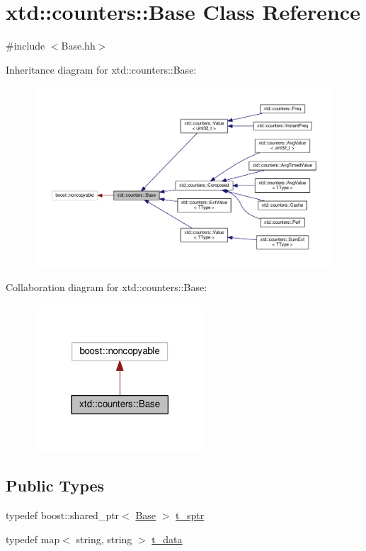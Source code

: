 \hypertarget{classxtd_1_1counters_1_1Base}{}\section{xtd\+:\+:counters\+:\+:Base Class Reference}
\label{classxtd_1_1counters_1_1Base}


{\ttfamily \#include $<$Base.\+hh$>$}



Inheritance diagram for xtd\+:\+:counters\+:\+:Base\+:
\nopagebreak
\begin{figure}[H]
\begin{center}
\leavevmode
\includegraphics[width=350pt]{classxtd_1_1counters_1_1Base__inherit__graph}
\end{center}
\end{figure}


Collaboration diagram for xtd\+:\+:counters\+:\+:Base\+:
\nopagebreak
\begin{figure}[H]
\begin{center}
\leavevmode
\includegraphics[width=182pt]{classxtd_1_1counters_1_1Base__coll__graph}
\end{center}
\end{figure}
\subsection*{Public Types}
\begin{DoxyCompactItemize}
\item 
typedef boost\+::shared\+\_\+ptr$<$ \hyperlink{classxtd_1_1counters_1_1Base}{Base} $>$ \hyperlink{classxtd_1_1counters_1_1Base_aa0ea634f1a5e3df87418566a3e8fcbd6}{t\+\_\+sptr}
\item 
typedef map$<$ string, string $>$ \hyperlink{classxtd_1_1counters_1_1Base_a8bb7d024911a4c454c003a18e330d268}{t\+\_\+data}
\end{DoxyCompactItemize}
